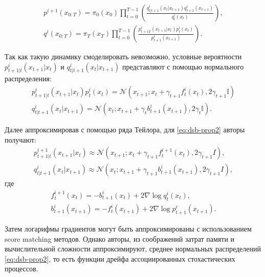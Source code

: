 \begin{equation}
    \begin{split}
        p^{i+1}(x_{0:T}) = \pi_0(x_0) \prod_{t=0}^{T-1} \left( \frac{q_{t|t+1}^i (x_t | x_{t+1}) q_{t+1}^i (x_{t+1})}{q_t^i (x_t)} \right),
        \\
        q^i(x_{0:T}) = \pi_T(x_T) \prod_{t=0}^{T-1} \left( \frac{p_{t+1|t}^i (x_{t+1} | x_t) p_t^i (x_t)}{p_{t+1}^i (x_{t+1})} \right).
    \end{split}
    \label{eq:dsb-prop2}
\end{equation}

Так как такую динамику смоделировать невозможно, условные вероятности $p_{t+1|t}^i(x_{t+1} | x_t)$ и $q_{t|t+1}^i (x_t | x_{t+1})$ представляют с помощью нормального распределения:
\begin{equation*}
    \begin{split}
        p_{t+1|t}^i (x_{t+1} | x_t) p_t^i (x_t) =  \mathcal{N}\left(x_{t+1};x_{t} + \gamma_{t+1}f^i_t(x_t), 2\gamma_{t+1}\mathbb{I}\right)
        \\
        q_{t|t+1}^i (x_t | x_{t+1}) = \mathcal{N}\left(x_{t};x_{t+1} + \gamma_{t}b^i_{t+1}(x_{t+1}), 2\gamma_{t}\mathbb{I}\right).
    \end{split}
\end{equation*}

Далее аппроксимировав с помощью ряда Тейлора, для \ref{eq:dsb-prop2} авторы получают:
\begin{equation*}
    \begin{split}
        p^{i+1}_{t+1|t}(x_{t+1} | x_t) \approx \mathcal{N}(x_{t+1}; x_t + \gamma_{t+1} f^{i+1}_t(x_t), 2 \gamma_{t+1} I), \\
        q^i_{t|t+1}(x_t | x_{t+1}) \approx \mathcal{N}(x_t; x_{t+1} + \gamma_{t+1} b^i_{t+1}(x_{t+1}), 2 \gamma_{t+1} I),        
    \end{split}
\end{equation*}
где
\begin{equation*}
    \begin{split}
        f^{i+1}_t(x_t) = -b^i_{t+1}(x_t) + 2 \nabla \log q^i_t(x_t), \\
        b^i_{t+1}(x_{t+1}) = -f^i_t(x_{t+1}) + 2 \nabla \log p^i_{t+1}(x_{t+1}).
    \end{split}
\end{equation*}

Затем логарифмы градиентов могут быть аппроксимированы с использованием score matching методов. Однако авторы, из соображений затрат памяти и вычислительной сложности аппроксимируют, среднее нормальных распределений \ref{eq:dsb-prop2}, то есть функции дрейфа ассоциированных стохастических процессов.

